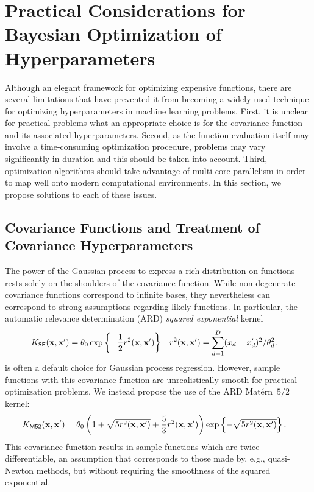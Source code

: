\documentclass[aos,preprint]{imsart}
\begin{document}
\section{Practical Considerations for Bayesian Optimization of Hyperparameters}

\label{sec:practical}
Although an elegant framework for optimizing expensive functions,
there are several limitations that have prevented it from becoming a
widely-used technique for optimizing hyperparameters in machine
learning problems.  First, it is unclear for practical problems what
an appropriate choice is for the covariance function and its
associated hyperparameters.  Second, as the function evaluation itself
may involve a time-consuming optimization procedure, problems may vary
significantly in duration and this should be taken into account.
Third, optimization algorithms should take advantage of multi-core
parallelism in order to map well onto modern computational
environments.  In this section, we propose solutions to each of these
issues.

\subsection{Covariance Functions and Treatment of Covariance Hyperparameters}
\label{sec:covariances}
The power of the Gaussian process to express a rich distribution on
functions rests solely on the shoulders of the covariance function.
While non-degenerate covariance functions correspond to infinite
bases, they nevertheless can correspond to strong assumptions
regarding likely functions.  In particular, the automatic relevance
determination (ARD) \emph{squared exponential} kernel 
\begin{align}
  K_{\sf{SE}}(\brmx,\brmx') &= \theta_0\exp\left\{-\frac{1}{2}r^2(\brmx,\brmx')\right\}
  &
  r^2(\brmx,\brmx') &= \sum^D_{d=1}(x_d-x'_d)^2/\theta_d^2.
\end{align}
is often a default choice for Gaussian process regression.  However,
sample functions with this covariance function are unrealistically
smooth for practical optimization problems.  We instead propose the
use of the ARD Mat\'{e}rn~$5/2$ kernel:
\begin{align}
  K_{\sf{M52}}(\brmx,\brmx') &= \theta_0
  \left(
  1+ \sqrt{5 r^2(\brmx,\brmx')} + \frac{5}{3}r^2(\brmx,\brmx')
  \right)
  \exp\left\{-\sqrt{5 r^2(\brmx,\brmx')}\right\}.
\end{align}
This covariance function results in sample functions which are
twice differentiable, an assumption that corresponds to those made by,
e.g., quasi-Newton methods, but without requiring the smoothness of
the squared exponential.
\end{document}
